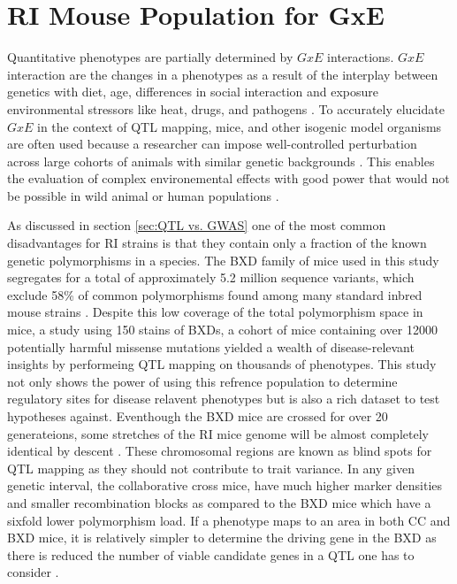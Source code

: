 \documentclass[a4paper,11pt,twoside]{book}
\begin{document}
	\section{RI Mouse Population for GxE}
	
	Quantitative phenotypes are partially determined by $GxE$ interactions. $GxE$ interaction are the changes in a phenotypes as a result of the interplay between genetics with diet, age, differences in social interaction and exposure environmental stressors like heat, drugs, and pathogens \citep{Williams2017ResourcesGenetics}. To accurately elucidate $GxE$ in the context of QTL mapping, mice, and other isogenic model organisms are often used because a researcher can impose well-controlled perturbation across large cohorts of animals with similar genetic backgrounds \citep{Williams2017ResourcesGenetics}. This enables the evaluation of complex environemental effects  with good power that would not be possible in wild animal or human populations \citep{Williams2017ResourcesGenetics}. 
	
    As discussed in section \ref{sec:QTL vs. GWAS} one of the most common disadvantages for RI strains is that they contain only a fraction of the known genetic polymorphisms in a species. The BXD family of mice used in this study segregates for a total of approximately 5.2 million sequence variants, which exclude 58\%  of common polymorphisms found among many standard inbred mouse strains \citep{Williams2017ResourcesGenetics}. Despite this low coverage of the total polymorphism space in mice, a study using 150 stains of BXDs, a cohort of mice containing over 12000 potentially harmful missense mutations  yielded a wealth of disease-relevant insights by performeing QTL mapping on thousands of phenotypes\citep*{Wang2016JointRisk}. This study not only shows the power of using this refrence population to determine regulatory sites for disease relavent phenotypes but is also a rich dataset to test hypotheses against. Eventhough the BXD mice are crossed for over 20 generateions, some stretches of the RI mice genome will be almost completely identical by descent \citep{Wang2016JointRisk}. These chromosomal regions are known as blind spots for QTL mapping as they should not contribute to trait variance\citep{Wang2016JointRisk}. In any given genetic interval, the collaborative cross mice, have much higher marker densities and smaller recombination blocks as compared to the BXD mice which have a sixfold lower polymorphism load. If a phenotype maps to an area in both CC and BXD mice, it is relatively simpler to determine the driving gene in the BXD as there is reduced the number of viable candidate genes in a QTL one has to consider \citep{Williams2017ResourcesGenetics}.
	
\end{document}
